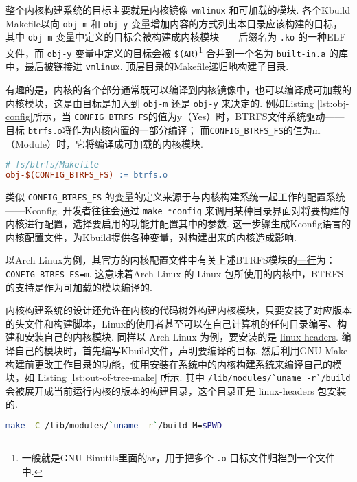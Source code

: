 整个内核构建系统的目标主要就是内核镜像 \lstinline{vmlinux} 和可加载的模块.
各个Kbuild Makefile以向 \lstinline{obj-m} 和 \lstinline{obj-y} 变量增加内容的方式列出本目录应该构建的目标，
其中 \lstinline{obj-m} 变量中定义的目标会被构建成内核模块——后缀名为 \lstinline{.ko} 的一种ELF文件，而 \lstinline{obj-y} 变量中定义的目标会被 \lstinline{$(AR)}\footnote{一般就是GNU Binutils里面的ar，用于把多个 \lstinline{.o} 目标文件归档到一个文件中.} 合并到一个名为 \lstinline{built-in.a} 的库中，最后被链接进 \lstinline{vmlinux}.
顶层目录的Makefile递归地构建子目录.

有趣的是，内核的各个部分通常既可以编译到内核镜像中，也可以编译成可加载的内核模块，这是由目标是加入到 \lstinline{obj-m} 还是 \lstinline{obj-y} 来决定的.
例如Listing \ref{lst:obj-config}所示，当 \lstinline{CONFIG_BTRFS_FS}的值为y（Yes）时，BTRFS文件系统驱动——目标 \lstinline{btrfs.o}将作为内核内置的一部分编译；
而\lstinline{CONFIG_BTRFS_FS}的值为m（Module）时，它将编译成可加载的内核模块.

\begin{lstlisting}[language=make, caption=可配置的编译目标, label=lst:obj-config]
# fs/btrfs/Makefile
obj-$(CONFIG_BTRFS_FS) := btrfs.o
\end{lstlisting}

类似 \lstinline{CONFIG_BTRFS_FS} 的变量的定义来源于与内核构建系统一起工作的配置系统——Kconfig.
%
开发者往往会通过 \lstinline{make *config} 来调用某种目录界面对将要构建的内核进行配置，选择要启用的功能并配置其中的参数.
这一步骤生成Kconfig语言的内核配置文件，为Kbuild提供各种变量，对构建出来的内核造成影响.

以Arch Linux为例，其官方的内核配置文件中有关上述BTRFS模块的\href{https://github.com/archlinux/svntogit-packages/blob/974377e2b1ab9e822c71fbb05a82bfb8dd9a7971/trunk/config#L9619}{一行}为：
\lstinline{CONFIG_BTRFS_FS=m}.
这意味着Arch Linux 的 Linux 包所使用的内核中，BTRFS的支持是作为可加载的模块编译的.

内核构建系统的设计还允许在内核的代码树外构建内核模块，只要安装了对应版本的头文件和构建脚本，Linux的使用者甚至可以在自己计算机的任何目录编写、构建和安装自己的内核模块.
同样以 Arch Linux 为例，要安装的是
\href{https://archlinux.org/packages/core/x86_64/linux-headers/}{linux-headers}.
编译自己的模块时，首先编写Kbuild文件，声明要编译的目标.
然后利用GNU Make构建前更改工作目录的功能，使用安装在系统中的内核构建系统来编译自己的模块，如 Listing \ref{lst:out-of-tree-make} 所示.
其中 \lstinline{/lib/modules/`uname -r`/build} 会被展开成当前运行内核的版本的构建目录，这个目录正是 linux-headers 包安装的.
\begin{lstlisting}[language=sh, caption=为本机的内核构建模块, label=lst:out-of-tree-make]
make -C /lib/modules/`uname -r`/build M=$PWD
\end{lstlisting}

